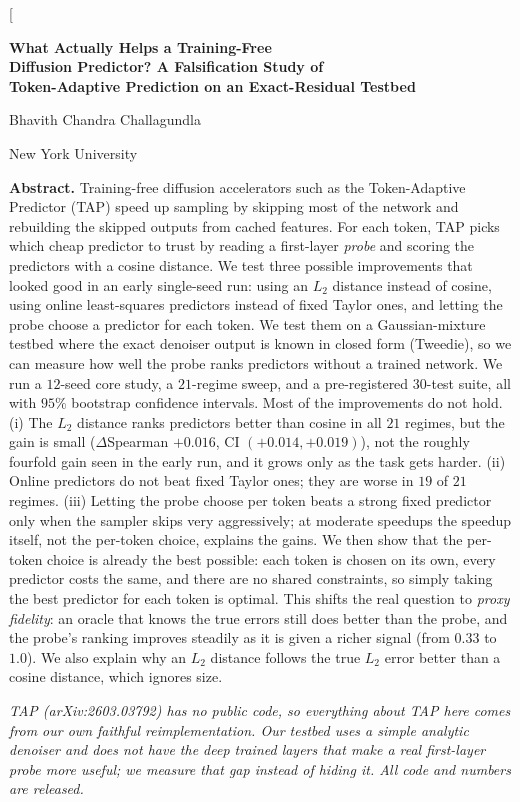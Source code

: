 \documentclass[10pt,twocolumn]{article}
\begin{document}
\twocolumn[
\begin{center}
{\LARGE\bfseries What Actually Helps a Training-Free\\[2pt]
Diffusion Predictor? A Falsification Study of\\[2pt]
Token-Adaptive Prediction on an Exact-Residual Testbed\par}
\vspace{10pt}
{\large Bhavith Chandra Challagundla\par}
\vspace{3pt}
{\small New York University\par}
\vspace{13pt}
\begin{minipage}{0.88\textwidth}
\small
\textbf{Abstract.} Training-free diffusion accelerators such as the Token-Adaptive
Predictor (TAP) speed up sampling by skipping most of the network and rebuilding the skipped
outputs from cached features. For each token, TAP picks which cheap predictor to trust by
reading a first-layer \emph{probe} and scoring the predictors with a cosine distance. We
test three possible improvements that looked good in an early single-seed run: using an
$L_2$ distance instead of cosine, using online least-squares predictors instead of fixed
Taylor ones, and letting the probe choose a predictor for each token. We test them on a
Gaussian-mixture testbed where the exact denoiser output is known in closed form (Tweedie),
so we can measure how well the probe ranks predictors without a trained network. We run a
$12$-seed core study, a $21$-regime sweep, and a pre-registered $30$-test suite, all with
$95\%$ bootstrap confidence intervals. Most of the improvements do not hold. (i) The $L_2$
distance ranks predictors better than cosine in all $21$ regimes, but the gain is small
($\Delta$Spearman $+0.016$, CI $(+0.014,+0.019)$), not the roughly fourfold gain seen in the
early run, and it grows only as the task gets harder. (ii) Online predictors do not beat
fixed Taylor ones; they are worse in $19$ of $21$ regimes. (iii) Letting the probe choose
per token beats a strong fixed predictor only when the sampler skips very aggressively; at
moderate speedups the speedup itself, not the per-token choice, explains the gains. We then
show that the per-token choice is already the best possible: each token is chosen on its
own, every predictor costs the same, and there are no shared constraints, so simply taking
the best predictor for each token is optimal. This shifts the real question to \emph{proxy
fidelity}: an oracle that knows the true errors still does better than the probe, and the
probe's ranking improves steadily as it is given a richer signal (from $0.33$ to $1.0$). We
also explain why an $L_2$ distance follows the true $L_2$ error better than a cosine
distance, which ignores size.\par
\vspace{4pt}
\textit{TAP (arXiv:2603.03792) has no public code, so everything about TAP here comes from
our own faithful reimplementation. Our testbed uses a simple analytic denoiser and does not
have the deep trained layers that make a real first-layer probe more useful; we measure that
gap instead of hiding it. All code and numbers are released.}
\end{minipage}
\end{center}
\end{document}
